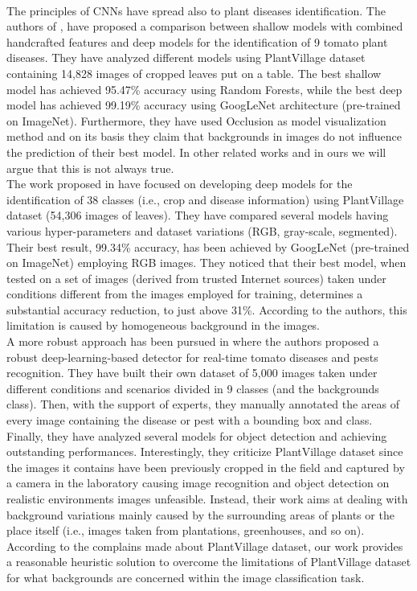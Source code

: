 \\\indent
The principles of CNNs have spread also to plant diseases identification. The authors of \cite{tunisia}, have proposed a comparison between shallow models with combined handcrafted features and deep models for the identification of 9 tomato plant diseases. They have analyzed different models using PlantVillage dataset containing 14,828 images of cropped leaves put on a table. The best shallow model has achieved 95.47\% accuracy using Random Forests, while the best deep model has achieved 99.19\% accuracy using GoogLeNet architecture (pre-trained on ImageNet). Furthermore, they have used Occlusion \cite{occlusion} as model visualization method and on its basis they claim that backgrounds in images do not influence the prediction of their best model. In other related works and in ours we will argue that this is not always true.
\\\indent
The work proposed in \cite{erba} have focused on developing deep models for the identification of 38 classes (i.e., crop and disease information) using PlantVillage dataset (54,306 images of leaves). They have compared several models having various hyper-parameters and dataset variations (RGB, gray-scale, segmented). Their best result, 99.34\% accuracy, has been achieved by GoogLeNet (pre-trained on ImageNet) employing RGB images. They noticed that their best model, when tested on a set of images (derived from trusted Internet sources) taken under conditions different from the images employed for training, determines a substantial accuracy reduction, to just above 31\%. According to the authors, this limitation is caused by homogeneous background in the images.
\\\indent
A more robust approach has been pursued in \cite{manzoni} where the authors proposed a robust deep-learning-based detector for real-time tomato diseases and pests recognition. They have built their own dataset of 5,000 images taken under different conditions and scenarios divided in 9 classes (and the backgrounds class). Then, with the support of experts, they manually annotated the areas of every image containing the disease or pest with a bounding box and class. Finally, they have analyzed several models for object detection and achieving outstanding performances. Interestingly, they criticize PlantVillage dataset since the images it contains have been previously cropped in the field and captured by a camera in the laboratory causing image recognition and object detection on realistic environments images unfeasible. Instead, their work aims at dealing with background variations mainly caused by the surrounding areas of plants or the place itself (i.e., images taken from plantations, greenhouses, and so on).
\\\indent
According to the complains made about PlantVillage dataset, our work provides a reasonable heuristic solution to overcome the limitations of PlantVillage dataset for what backgrounds are concerned within the image classification task.